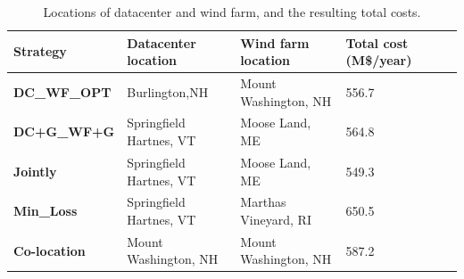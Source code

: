 \begin{table}[ht]
\begin{center}
\caption{Locations of datacenter and wind farm, and the resulting
  total costs.}
\begin{tabular}{|l|p{50pt}|p{50pt}|p{30pt}|p{20pt}|}
\hline
\textbf{Strategy}& \textbf{Datacenter location} &\textbf{Wind farm location} &\textbf{Total cost (M\$/year)}%
 \\
\hline
\textbf{DC\_WF\_OPT} &  Burlington,NH  & Mount Washington, NH & 556.7%
\\
\textbf{DC+G\_WF+G} &Springfield Hartnes, VT  & Moose Land, ME& 564.8%
\\
\textbf{Jointly} &Springfield Hartnes, VT&  Moose Land, ME & 549.3%
\\
\textbf{Min\_Loss} &Springfield Hartnes, VT & Marthas Vineyard, RI & 650.5%
\\
\textbf{Co-location}& Mount Washington, NH &Mount Washington, NH& 587.2%
\\
\hline
\end{tabular}
\label{tab:costsaving}
\end{center}
\vspace{-0.2in}
\end{table}

